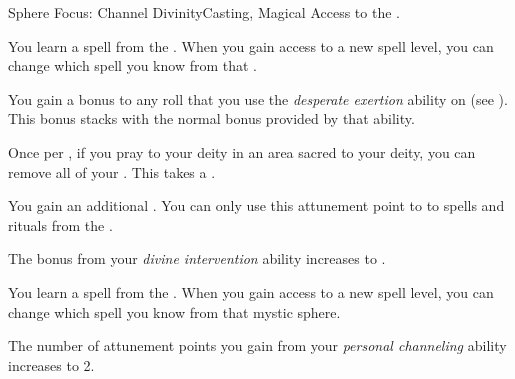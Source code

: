     \begin{feat}{Sphere Focus: Channel Divinity}{Casting, Magical}
        \featpre Access to the  .

         You learn a spell from the  .
        When you gain access to a new spell level, you can change which spell you know from that .

         You gain a  bonus to any roll that you use the \textit{desperate exertion} ability on (see ).
        This bonus stacks with the normal  bonus provided by that ability.

         Once per , if you pray to your deity in an area sacred to your deity, you can remove all of your .
        This takes a .

         You gain an additional .
        You can only use this attunement point to  to spells and rituals from the  .

         The bonus from your \textit{divine intervention} ability increases to .

         You learn a spell from the  .
        When you gain access to a new spell level, you can change which spell you know from that mystic sphere.

         The number of attunement points you gain from your \textit{personal channeling} ability increases to 2.
    \end{feat}

